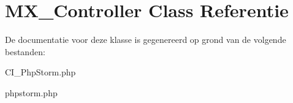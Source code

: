 \hypertarget{class_m_x___controller}{}\section{M\+X\+\_\+\+Controller Class Referentie}
\label{class_m_x___controller}


De documentatie voor deze klasse is gegenereerd op grond van de volgende bestanden\+:\begin{DoxyCompactItemize}
\item 
C\+I\+\_\+\+Php\+Storm.\+php\item 
phpstorm.\+php\end{DoxyCompactItemize}
